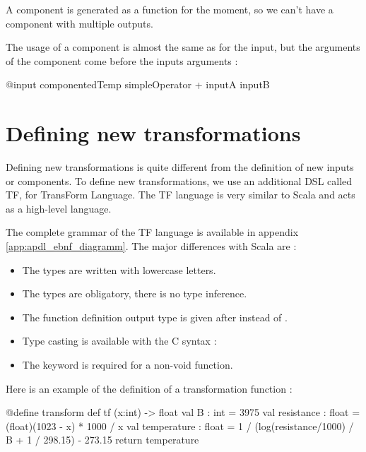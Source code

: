 A component is generated as a function for the moment, so we can't have
a component with multiple outputs.

The usage of a component is almost the same as for the input, but the arguments
of the component come before the inputs arguments :
\begin{apdlcode}
@input componentedTemp simpleOperator + inputA inputB
\end{apdlcode}

\section*{Defining new transformations} 

Defining new transformations is quite different from the definition of new
inputs or components. To define new transformations, we use an additional DSL called TF,
for TransForm Language. The TF language is very similar to Scala and acts as a
high-level language.

The complete grammar of the TF language is available in appendix
\ref{app:apdl_ebnf_diagramm}. The major differences with Scala are :
\begin{itemize}
\item The types are written with lowercase letters.
\item The types are obligatory, there is no type inference.
\item The function definition output type is given after \apdlinline{->} instead
  of \apdlinline{:}.
\item Type casting is available with the C syntax : 
\item The  keyword is required for a non-void function.
\end{itemize}

Here is an example of the definition of a transformation function :
\begin{apdlcode}
@define transform def tf (x:int) -> float {
    val B : int = 3975
    val resistance : float = (float)(1023 - x) * 1000 / x
    val temperature : float = 1 / (log(resistance/1000) / B + 1 / 298.15) - 273.15
    return temperature
}
\end{apdlcode}